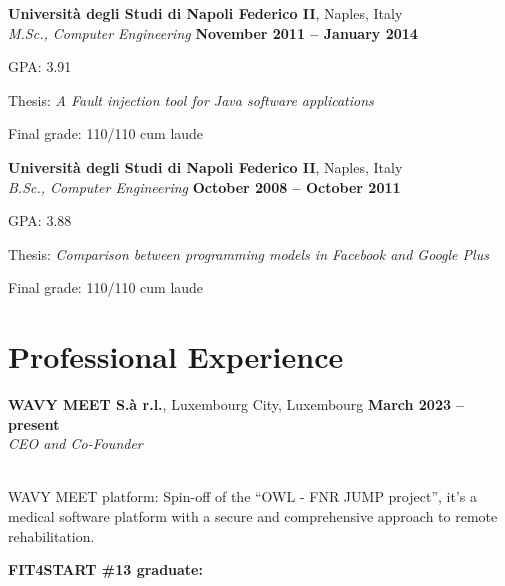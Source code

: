 \documentclass[margin,line]{resume}
\begin{document}
\begin{resume}
\textbf{Universit\`a degli Studi di Napoli Federico II}, Naples, Italy \vspace{1mm}\\%
\textsl{M.Sc., Computer Engineering} \hfill \textbf{November 2011 -- January 2014}\vspace{-3mm}\\\vspace{-1mm}%
\begin{list2}
	\item GPA: 3.91
	\item Thesis: \textsl{A Fault injection tool for Java software applications}
	\item Final grade: 110/110 cum laude
\end{list2}\vspace{-1.5mm}    


\textbf{Universit\`a degli Studi di Napoli Federico II}, Naples, Italy \vspace{1mm}\\%
\textsl{B.Sc., Computer Engineering} \hfill \textbf{October 2008 -- October 2011}\vspace{-3mm}\\\vspace{-1mm}%
\begin{list2}
	\item GPA: 3.88
	\item Thesis: \textsl{Comparison between programming models in Facebook and Google Plus}
        \item Final grade: 110/110 cum laude
\end{list2}\vspace{-1.5mm}    


\section{\mysidestyle Professional Experience}

\textbf{WAVY MEET S.à r.l.}, Luxembourg City, Luxembourg \hfill \textbf{March 2023 -- present}\\
\textit{CEO and Co-Founder}\hfill\\
\vspace{-3mm}\\\vspace{-1mm}
\begin{list2}
	\item \filbreak WAVY MEET platform: Spin-off of the ``OWL - FNR JUMP project'', it's a medical software platform with a secure and comprehensive approach to remote rehabilitation.
	\item \filbreak\textbf{FIT4START \#13 graduate:} 
	

\end{list2}
\end{resume}
\end{document}
